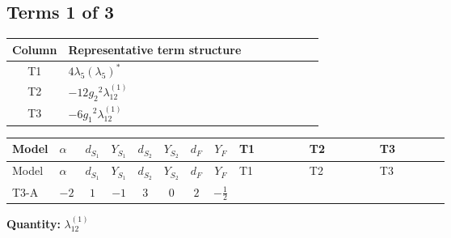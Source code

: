 \documentclass[8pt]{article}
\begin{document}
\begin{landscape}
\subsection*{Terms 1 of 3}
\begin{center}
\begin{tabular}{@{}c >{\raggedright\arraybackslash}p{0.82\linewidth}@{}}
\toprule
Column & Representative term structure \\
\midrule
T1 & \(\displaystyle 4 {\lambda_5} \left({\lambda_5}\right)^{*}\) \\
\midrule
T2 & \(\displaystyle -12 {g_2}^2 {\lambda_{12}^{(1)}}\) \\
\midrule
T3 & \(\displaystyle -6 {g_1}^2 {\lambda_{12}^{(1)}}\) \\
\midrule
\bottomrule
\end{tabular}
\end{center}
\smallskip
\tiny
\begin{longtable}{@{}llcccccc >{\raggedright\arraybackslash}p{0.21\linewidth} >{\raggedright\arraybackslash}p{0.21\linewidth} >{\raggedright\arraybackslash}p{0.21\linewidth}@{}}
\toprule
Model & $\alpha$ & $d_{S_1}$ & $Y_{S_1}$ & $d_{S_2}$ & $Y_{S_2}$ & $d_F$ & $Y_F$ & T1 & T2 & T3 \\
\midrule
\endfirsthead
\toprule
Model & $\alpha$ & $d_{S_1}$ & $Y_{S_1}$ & $d_{S_2}$ & $Y_{S_2}$ & $d_F$ & $Y_F$ & T1 & T2 & T3 \\
\midrule
\endhead
T3-A & $-2$ & $1$ & $-1$ & $3$ & $0$ & $2$ & $-\frac{1}{2}$ & \scriptsize\adjustbox{max width=\linewidth}{$\begin{gathered} 4 {\lambda_5} \left({\lambda_5}\right)^{*}\end{gathered}$} & \scriptsize\adjustbox{max width=\linewidth}{$\begin{gathered} -12 {g_2}^2 {\lambda_{12}^{(1)}}\end{gathered}$} & \scriptsize\adjustbox{max width=\linewidth}{$\begin{gathered} -6 {g_1}^2 {\lambda_{12}^{(1)}}\end{gathered}$} \\
\midrule
\bottomrule
\end{longtable}
\clearpage
\noindent\textbf{Quantity: }$\lambda_{12}^{(1)}$\par\smallskip

\end{landscape}
\end{document}
